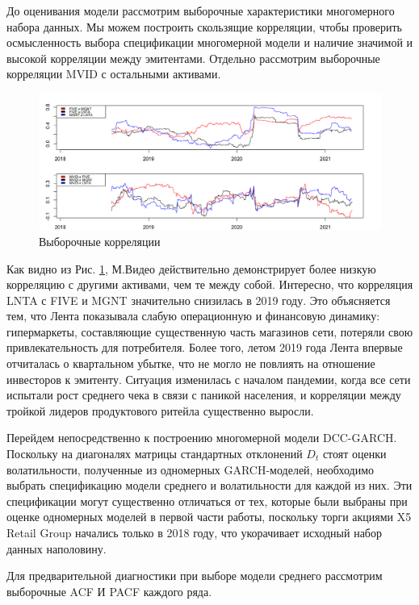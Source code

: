 \documentclass[a4paper,12pt,twoside]{article}
\begin{document}
До оценивания модели рассмотрим выборочные характеристики многомерного набора данных. Мы можем построить скользящие корреляции, чтобы проверить осмысленность выбора спецификации многомерной модели и наличие значимой и высокой корреляции между эмитентами. Отдельно рассмотрим выборочные корреляции MVID с остальными активами.

\begin{figure}[h]
    \includegraphics[scale = 0.45]{mult_corr_1.png}
    \caption{Выборочные корреляции}
    \label{fig:rollcorr1}
\end{figure}

Как видно из Рис. \ref{fig:rollcorr1}, М.Видео действительно демонстрирует более низкую корреляцию с другими активами, чем те между собой. Интересно, что корреляция LNTA с FIVE и MGNT значительно снизилась в 2019 году. Это объясняется тем, что Лента показывала слабую операционную и финансовую динамику: гипермаркеты, составляющие существенную часть магазинов сети, потеряли свою привлекательность для потребителя. Более того, летом 2019 года Лента впервые отчиталась о квартальном убытке, что не могло не повлиять на отношение инвесторов к эмитенту. Ситуация изменилась с началом пандемии, когда все сети испытали рост среднего чека в связи с паникой населения, и корреляции между тройкой лидеров продуктового ритейла существенно выросли.

Перейдем непосредственно к построению многомерной модели DCC-GARCH. Поскольку на диагоналях матрицы стандартных отклонений $D_t$ стоят оценки волатильности, полученные из одномерных GARCH-моделей, необходимо выбрать спецификацию модели среднего и волатильности для каждой из них. Эти спецификации могут существенно отличаться от тех, которые были выбраны при оценке одномерных моделей в первой части работы, поскольку торги акциями X5 Retail Group начались только в 2018 году, что укорачивает исходный набор данных наполовину.

Для предварительной диагностики при выборе модели среднего рассмотрим выборочные ACF И PACF каждого ряда.
\end{document}
